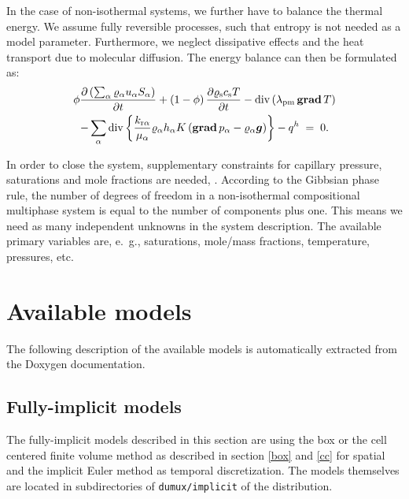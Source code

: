 In the case of non-isothermal systems, we further have to balance the
thermal energy. We assume fully reversible processes, such that entropy
is not needed as a model parameter. Furthermore, we neglect 
dissipative effects and the heat transport due to molecular
diffusion. The energy balance can then be
formulated as:
%
\begin{multline}
  \label{A3:eqenergmak1}
  \phi \frac{\partial \left( \sum_\alpha \varrho_{\alpha}
      u_\alpha S_\alpha \right)}{\partial t} + \left( 1 -
    \phi \right) \frac{\partial \varrho_{\text{s}} c_{\text{s}}
    T}{\partial t}  
 - \operatorname{div} \left( \lambda_{\text{pm}} \operatorname{\bf grad} T \right)
   \\
   - \sum\limits_\alpha \operatorname{div} \left\lbrace \frac{k_{\text{r}
        \alpha}}{\mu_\alpha} \varrho_{\alpha} h_\alpha
    K \left( \operatorname{\bf grad} p_\alpha - \varrho_{\alpha}
      \boldsymbol{g} \right) \right\rbrace 
 - q^h \; = \; 0.
\end{multline}

In order to close the system, supplementary constraints for capillary pressure, saturations and mole
fractions are needed, \cite{A3:helmig:1997}. 
According to the Gibbsian phase rule, the number of degrees of freedom
in a non-isothermal compositional multiphase system is equal to the
number of components plus one. This means we need as many independent
unknowns in the system description. The
available primary variables are, e.\ g., saturations, mole/mass
fractions, temperature, pressures, etc.




\section{Available models} 
The following description of the available models is automatically extracted 
from the Doxygen documentation.

\subsection{Fully-implicit models}

The fully-implicit models described in this section are using the box or the cell centered finite volume method as described in section \ref{box} and \ref{cc} for spatial and the implicit Euler
method as temporal discretization. The models themselves are located in
subdirectories of \texttt{dumux/implicit} of the \Dumux distribution.

